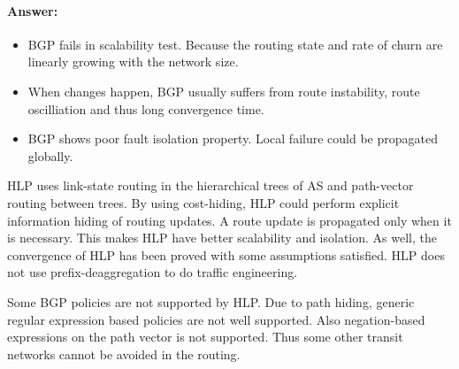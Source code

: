 \documentclass[a4paper,11pt]{article}
\theoremstyle{mytheor}
\begin{document}
\begin{enumerate}
\paragraph{Answer:}
\begin{itemize}
\item BGP fails in scalability test. 
Because the routing state and rate of churn are linearly growing with the network size.
\item When changes happen, BGP usually suffers from route instability, route oscilliation and thus long convergence time.
\item BGP shows poor fault isolation property.
Local failure could be propagated globally.
\end{itemize}

HLP uses link-state routing in the hierarchical trees of AS and path-vector routing between trees.
By using cost-hiding, HLP could perform explicit information hiding of routing updates.
A route update is propagated only when it is necessary.
This makes HLP have better scalability and isolation.
As well, the convergence of HLP has been proved with some assumptions satisfied.
HLP does not use prefix-deaggregation to do traffic engineering.

Some BGP policies are not supported by HLP.
Due to path hiding, generic regular expression based policies are not well supported.
Also negation-based expressions on the path vector is not supported. 
Thus some other transit networks cannot be avoided in the routing.

\end{enumerate}
\end{document}
